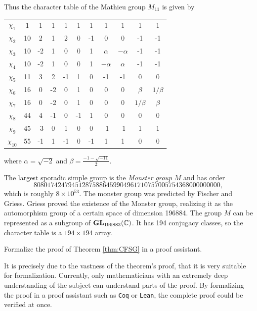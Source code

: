 
Thus the character table of the Mathieu group $M_{11}$ is
given by
\begin{center}
		\begin{tabular}{|c|cccccccccc|}
			\hline
			$\chi_{1}$ & 1 & 1 & 1 & 1 & 1 & 1 & 1 & 1 & 1 & 1\tabularnewline
			$\chi_{2}$ & 10 & 2 & 1 & 2 & 0 & -1 & 0 & 0 & -1 & -1 \tabularnewline
			$\chi_{3}$ & 10 & -2 & 1 & 0 & 0 & 1 & $\alpha$ & $-\alpha$ & -1 & -1\tabularnewline
		    $\chi_{4}$ & 10 & -2 & 1 & 0 & 0 & 1 & $-\alpha$ & $\alpha$ & -1 & -1\tabularnewline
		    $\chi_{5}$ & 11 & 3 & 2 &-1 & 1 & 0 & -1 & -1 & 0 & 0\tabularnewline
			$\chi_{6}$ & 16 & 0 & -2 & 0 & 1 & 0 & 0 & 0 & $\beta$ & $1/\beta$\tabularnewline
			$\chi_{7}$ & 16 & 0 & -2 & 0 & 1 & 0 & 0 & 0 & $1/\beta$ & $\beta$\tabularnewline
			$\chi_{8}$ & 44 & 4 &-1 & 0 &-1 & 1 & 0 & 0 & 0 & 0\tabularnewline
			$\chi_{9}$ & 45 & -3 & 0 & 1 & 0 & 0 &-1 &-1 &  1 & 1\tabularnewline
			$\chi_{10}$ & 55 & -1 & 1 & -1 & 0 & -1 & 1 & 1 & 0 & 0\tabularnewline
			\hline
		\end{tabular}    
\end{center}
where $\alpha=\sqrt{-2}$ and $\beta=\frac{-1-\sqrt{-11}}{2}$. 

The largest sporadic simple group is the \emph{Monster group} $M$ and has order
\[
808017424794512875886459904961710757005754368000000000, 
\]
which is roughly $8\times 10^{53}$. 
The monster group was predicted by Fischer and Griess. 
Griess proved the existence of the Monster group, realizing it as
the automorphism group of a certain space of dimension 196884. 
The group $M$ can be represented as
a subgroup of $\mathbf{GL}_{196883}(\mathbb{C})$. It has 194 conjugacy classes, so 
the character table is a $194\times 194$ array. 

\begin{problem}
    Formalize the proof of Theorem \ref{thm:CFSG} in a proof assistant. 
\end{problem}

It is precisely due to the vastness of the theorem’s proof, that it is very suitable for formalization. Currently, only mathematicians with an extremely deep understanding of the subject can understand parts of the proof. 
By formalizing the proof in a proof assistant such as \lstinline{Coq} or \lstinline{Lean}, 
the complete proof could be verified at once. 